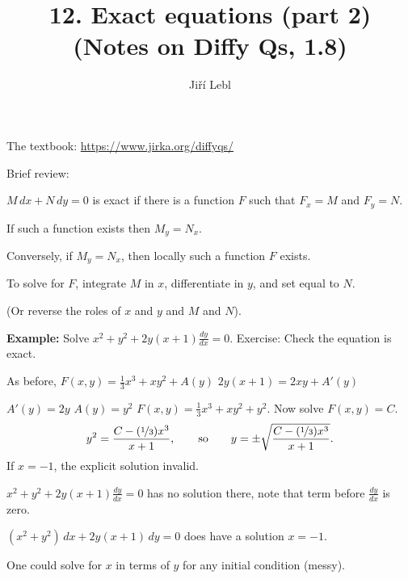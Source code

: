 \documentclass[10pt,aspectratio=169]{beamer}
\author{Ji\v{r}\'i Lebl}
\institute[OSU]{%
Oklahoma State University%
}
\title{12. Exact equations (part 2)\\(Notes on Diffy Qs, 1.8)}
\date{}
\begin{document}
\begin{frame}
\titlepage


\begin{center}
The textbook: \url{https://www.jirka.org/diffyqs/}
\end{center}
\end{frame}

\begin{frame}
Brief review:

\medskip
\pause

$M \, dx + N \, dy = 0$ is exact if there is a
function $F$ such that $F_x = M$ and $F_y = N$.

\medskip
\pause

If such a function exists then $M_y = N_x$.

\pause

Conversely, if $M_y = N_x$, then 
locally such a function $F$ exists.

\medskip
\pause

To solve for $F$, integrate $M$ in $x$, differentiate
in $y$, and set equal to $N$.

\pause
(Or reverse the roles of $x$ and $y$ and $M$ and $N$).

\end{frame}

\begin{frame}

\textbf{Example:}
Solve
\quad
$x^2+y^2 + 2y(x+1) \frac{dy}{dx} = 0$.
\qquad
\pause
Exercise:
Check the equation is exact.

\medskip
\pause

As before,
\quad
$F(x,y) = \frac{1}{3}x^3 + xy^2 + A(y)$
\pause
\wthus
$2y(x+1) = 2xy + A'(y)$

\medskip
\pause

\thus \quad $A'(y)=2y$
\pause
\wthus
$A(y) = y^2$
\pause
\wthus
$F(x,y) = \frac{1}{3}x^3 + xy^2 + y^2$.
\quad
\pause
Now solve $F(x,y) = C$.
\pause
\begin{equation*}
y^2 = \frac{C-(\nicefrac{1}{3})x^3}{x+1},
\qquad \text{so} \qquad
y = \pm \sqrt{\frac{C-(\nicefrac{1}{3})x^3}{x+1}} .
\end{equation*}
If $x=-1$, the explicit solution invalid.

\medskip
\pause

$x^2+y^2 + 2y(x+1) \frac{dy}{dx} = 0$ has no solution there,
note that term before
$\frac{dy}{dx}$ is zero.

\medskip
\pause

$(x^2+y^2) \, dx + 2y(x+1) \, dy = 0$ does have a solution $x=-1$.

\medskip
\pause

One could solve for $x$ in terms of $y$ for any initial condition (messy).
\end{frame}
\end{document}
